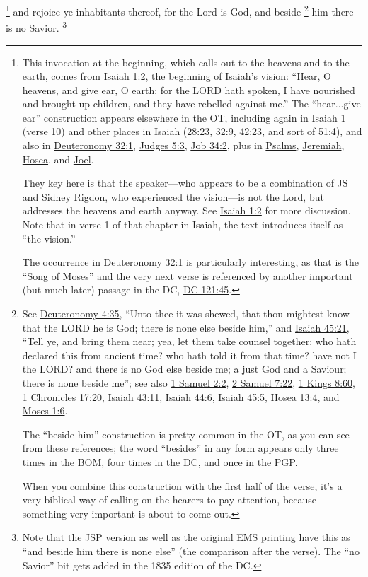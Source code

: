 			\footnote{%
				\label{DC76-1-hear}%
				This invocation at the beginning, which calls out to the heavens and to the earth, comes from \hyperref[ISAIAH-1-2]{Isaiah 1:2}, the beginning of Isaiah's vision: ``Hear, O heavens, and give ear, O earth: for the LORD hath spoken, I have nourished and brought up children, and they have rebelled against me.'' The ``hear...give ear'' construction appears elsewhere in the OT, including again in Isaiah 1 (\hyperref[ISAIAH-1-10]{verse 10}) and other places in Isaiah (\hyperref[ISAIAH-28-23]{28:23}, \hyperref[ISAIAH-32-9]{32:9}, \hyperref[ISAIAH-42-23]{42:23}, and sort of \hyperref[ISAIAH-51-4]{51:4}), and also in \hyperref[DEUTERONOMY-32-1]{Deuteronomy 32:1}, \hyperref[JUDGES-5-3]{Judges 5:3}, \hyperref[JOB-34-2]{Job 34:2}, plus in \hyperref[PSALMS]{Psalms}, \hyperref[JEREMIAH]{Jeremiah}, \hyperref[HOSEA]{Hosea}, and \hyperref[JOEL]{Joel}.
				
				They key here is that the speaker---who appears to be a combination of JS and Sidney Rigdon, who experienced the vision---is not the Lord, but addresses the heavens and earth anyway. See \hyperref[ISAIAH-1-2]{Isaiah 1:2} for more discussion. Note that in verse 1 of that chapter in Isaiah, the text introduces itself as ``the vision.''
				
				The occurrence in \hyperref[DEUTERONOMY-32-1]{Deuteronomy 32:1} is particularly interesting, as that is the ``Song of Moses'' and the very next verse is referenced by another important (but much later) passage in the DC, \hyperref[DC121-45]{DC 121:45}.
				}
		and rejoice ye inhabitants thereof, for the Lord is God, and beside%
			\footnote{%
				\label{DC76-1-beside}%
				See \hyperref[DEUTERONOMY-4-35]{Deuteronomy 4:35}, ``Unto thee it was shewed, that thou mightest know that the LORD he is God; there is none else beside him,'' and \hyperref[ISAIAH-45-21]{Isaiah 45:21}, ``Tell ye, and bring them near; yea, let them take counsel together: who hath declared this from ancient time? who hath told it from that time? have not I the LORD? and there is no God else beside me; a just God and a Saviour; there is none beside me''; see also \hyperref[1SAMUEL-2-2]{1 Samuel 2:2}, \hyperref[2SAMUEL-7-22]{2 Samuel 7:22}, \hyperref[1KINGS-8-60]{1 Kings 8:60}, \hyperref[1CHRONICLES-17-20]{1 Chronicles 17:20}, \hyperref[ISAIAH-43-11]{Isaiah 43:11}, \hyperref[ISAIAH-44-6]{Isaiah 44:6}, \hyperref[ISAIAH-45-5]{Isaiah 45:5}, \hyperref[HOSEA-13-4]{Hosea 13:4}, and \hyperref[MOSES-1-6]{Moses 1:6}.
				
				The ``beside him'' construction is pretty common in the OT, as you can see from these references; the word ``besides'' in any form appears only three times in the BOM, four times in the DC, and once in the PGP.
				
				When you combine this construction with the first half of the verse, it's a very biblical way of calling on the hearers to pay attention, because something very important is about to come out.
				}
		him there is no Savior.%
			\footnote{%
				\label{DC76-1-savior}%
				Note that the JSP version as well as the original EMS printing have this as ``and beside him there is none else'' (the comparison after the verse). The ``no Savior'' bit gets added in the 1835 edition of the DC.
				}

